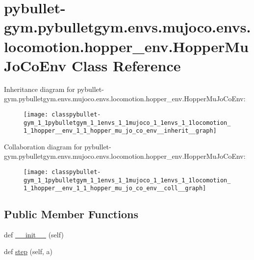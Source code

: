 \hypertarget{classpybullet-gym_1_1pybulletgym_1_1envs_1_1mujoco_1_1envs_1_1locomotion_1_1hopper__env_1_1_hopper_mu_jo_co_env}{}\section{pybullet-\/gym.pybulletgym.\+envs.\+mujoco.\+envs.\+locomotion.\+hopper\+\_\+env.\+Hopper\+Mu\+Jo\+Co\+Env Class Reference}
\label{classpybullet-gym_1_1pybulletgym_1_1envs_1_1mujoco_1_1envs_1_1locomotion_1_1hopper__env_1_1_hopper_mu_jo_co_env}


Inheritance diagram for pybullet-\/gym.pybulletgym.\+envs.\+mujoco.\+envs.\+locomotion.\+hopper\+\_\+env.\+Hopper\+Mu\+Jo\+Co\+Env\+:
\nopagebreak
\begin{figure}[H]
\begin{center}
\leavevmode
\texttt{[image: classpybullet-gym\_1\_1pybulletgym\_1\_1envs\_1\_1mujoco\_1\_1envs\_1\_1locomotion\_1\_1hopper\_\_env\_1\_1\_hopper\_mu\_jo\_co\_env\_\_inherit\_\_graph]}
\end{center}
\end{figure}


Collaboration diagram for pybullet-\/gym.pybulletgym.\+envs.\+mujoco.\+envs.\+locomotion.\+hopper\+\_\+env.\+Hopper\+Mu\+Jo\+Co\+Env\+:
\nopagebreak
\begin{figure}[H]
\begin{center}
\leavevmode
\texttt{[image: classpybullet-gym\_1\_1pybulletgym\_1\_1envs\_1\_1mujoco\_1\_1envs\_1\_1locomotion\_1\_1hopper\_\_env\_1\_1\_hopper\_mu\_jo\_co\_env\_\_coll\_\_graph]}
\end{center}
\end{figure}
\subsection*{Public Member Functions}
\begin{DoxyCompactItemize}
\item 
def \hyperlink{classpybullet-gym_1_1pybulletgym_1_1envs_1_1mujoco_1_1envs_1_1locomotion_1_1hopper__env_1_1_hopper_mu_jo_co_env_aea5e40f2aa69f851b02e6b4b2a8cf0bd}{\+\_\+\+\_\+init\+\_\+\+\_\+} (self)
\item 
def \hyperlink{classpybullet-gym_1_1pybulletgym_1_1envs_1_1mujoco_1_1envs_1_1locomotion_1_1hopper__env_1_1_hopper_mu_jo_co_env_a17f12daaa2b5d0b773d5d5f9e24483c4}{step} (self, a)
\end{DoxyCompactItemize}

